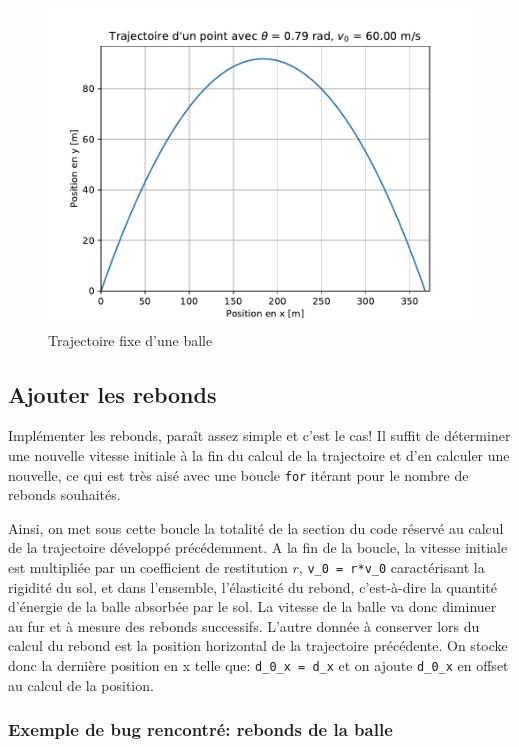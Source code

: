 \documentclass[a4paper, 11pt]{article}
\begin{document}
\begin{figure}[H]
	\centering
	\includegraphics[scale=0.5]{Figures/imgtraject_fixe.pdf}
	\caption{Trajectoire fixe d'une balle}
	\label{fig:traject} 
\end{figure}

\subsection{Ajouter les rebonds}

Implémenter les rebonds, paraît assez simple et c'est le cas! Il suffit de déterminer une nouvelle vitesse initiale à la fin du calcul de la trajectoire et d'en calculer une nouvelle, ce qui est très aisé avec une boucle \verb|for| itérant pour le nombre de rebonds souhaités.

Ainsi, on met sous cette boucle la totalité de la section du code réservé au calcul de la trajectoire développé précédemment. A la fin de la boucle, la vitesse initiale est multipliée par un coefficient de restitution $r$, \verb|v_0 = r*v_0| caractérisant la rigidité du sol, et dans l'ensemble, l'élasticité du rebond, c'est-à-dire la quantité d'énergie de la balle absorbée par le sol. La vitesse de la balle va donc diminuer au fur et à mesure des rebonds successifs. L'autre donnée à conserver lors du calcul du rebond est la position horizontal de la trajectoire précédente. On stocke donc la dernière position en x telle que: \verb|d_0_x = d_x| et on ajoute \verb|d_0_x| en offset au calcul de la position. 


\subsubsection{Exemple de bug rencontré: rebonds de la balle}
\end{document}
